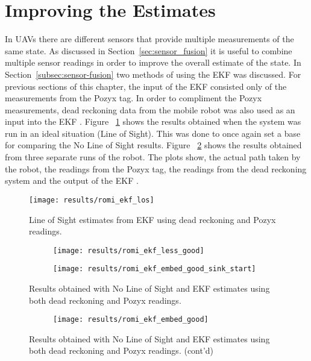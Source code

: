 \section{Improving the Estimates}\label{sec:improving-the-estimates}
In UAVs there are different sensors that provide multiple measurements of the same state.
As discussed in Section~\ref{sec:sensor_fusion} it is useful to combine multiple sensor readings in order to improve the overall estimate of the state.
In Section~\ref{subsec:sensor-fusion} two methods of using the EKF was discussed.
For previous sections of this chapter, the input of the EKF consisted only of the measurements from the Pozyx tag.
In order to compliment the Pozyx measurements, dead reckoning data from the mobile robot was also used as an input into the EKF .
Figure ~\ref{fig:romi_los} shows the results obtained when the system was run in an ideal situation (Line of Sight).
This was done to once again set a base for comparing the No Line of Sight results.
Figure ~\ref{fig:romi_nlos_ekf} shows the results obtained from three separate runs of the robot.
The plots show, the actual path taken by the robot, the readings from the Pozyx tag, the readings from the dead reckoning system and the output of the EKF .
\begin{figure}[ht!]
    \centering
    \texttt{[image: results/romi\_ekf\_los]}
    \caption{Line of Sight estimates from EKF using dead reckoning and Pozyx readings.}
    \label{fig:romi_los}
\end{figure}

\begin{figure}[ht!]
    \centering
    \begin{subfigure}{0.7\textwidth}
            \texttt{[image: results/romi\_ekf\_less\_good]}
    \end{subfigure}
    \begin{subfigure}{0.7\textwidth}
            \texttt{[image: results/romi\_ekf\_embed\_good\_sink\_start]}
    \end{subfigure}
    \caption{Results obtained with No Line of Sight and EKF estimates using both dead reckoning and Pozyx readings.}
    \label{fig:romi_nlos_ekf}
\end{figure}
\begin{figure}[ht!]\ContinuedFloat
    \centering
    \begin{subfigure}{0.7\textwidth}
            \texttt{[image: results/romi\_ekf\_embed\_good]}
    \end{subfigure}
    \caption[]{Results obtained with No Line of Sight and EKF estimates using both dead reckoning and Pozyx readings. (cont'd)}
\end{figure}
\newpage

